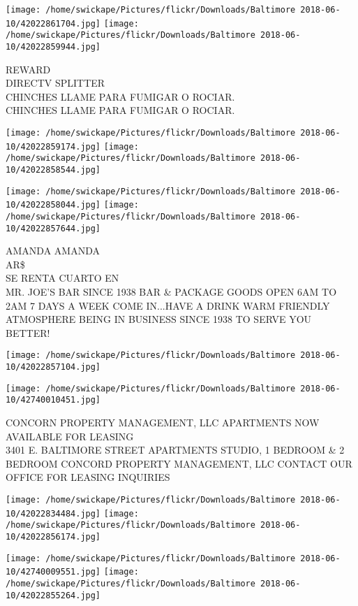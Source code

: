 \documentclass[10pt,letterpaper]{article}
\begin{document}
\texttt{[image: /home/swickape/Pictures/flickr/Downloads/Baltimore 2018-06-10/42022861704.jpg]}
\texttt{[image: /home/swickape/Pictures/flickr/Downloads/Baltimore 2018-06-10/42022859944.jpg]}

REWARD\\
DIRECTV SPLITTER\\
CHINCHES LLAME PARA FUMIGAR O ROCIAR.\\
CHINCHES LLAME PARA FUMIGAR O ROCIAR.\\
\pagebreak

\texttt{[image: /home/swickape/Pictures/flickr/Downloads/Baltimore 2018-06-10/42022859174.jpg]}
\texttt{[image: /home/swickape/Pictures/flickr/Downloads/Baltimore 2018-06-10/42022858544.jpg]}

\texttt{[image: /home/swickape/Pictures/flickr/Downloads/Baltimore 2018-06-10/42022858044.jpg]}
\texttt{[image: /home/swickape/Pictures/flickr/Downloads/Baltimore 2018-06-10/42022857644.jpg]}

AMANDA AMANDA\\
AR\$\\
SE RENTA CUARTO EN\\
MR. JOE'S BAR SINCE 1938 BAR \& PACKAGE GOODS OPEN 6AM TO 2AM 7 DAYS A WEEK COME IN...HAVE A DRINK WARM FRIENDLY ATMOSPHERE BEING IN BUSINESS SINCE 1938 TO SERVE YOU BETTER!\\
\pagebreak

\texttt{[image: /home/swickape/Pictures/flickr/Downloads/Baltimore 2018-06-10/42022857104.jpg]}

\vspace{0.25in}
\texttt{[image: /home/swickape/Pictures/flickr/Downloads/Baltimore 2018-06-10/42740010451.jpg]}

CONCORN PROPERTY MANAGEMENT, LLC APARTMENTS NOW AVAILABLE FOR LEASING\\
3401 E. BALTIMORE STREET APARTMENTS STUDIO, 1 BEDROOM \& 2 BEDROOM CONCORD PROPERTY MANAGEMENT, LLC CONTACT OUR OFFICE FOR LEASING INQUIRIES\\
\pagebreak

\texttt{[image: /home/swickape/Pictures/flickr/Downloads/Baltimore 2018-06-10/42022834484.jpg]}
\texttt{[image: /home/swickape/Pictures/flickr/Downloads/Baltimore 2018-06-10/42022856174.jpg]}

\texttt{[image: /home/swickape/Pictures/flickr/Downloads/Baltimore 2018-06-10/42740009551.jpg]}
\texttt{[image: /home/swickape/Pictures/flickr/Downloads/Baltimore 2018-06-10/42022855264.jpg]}
\end{document}
